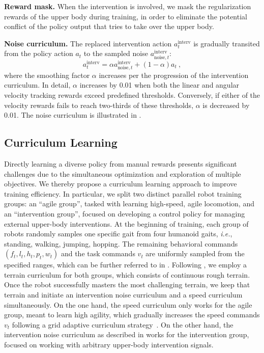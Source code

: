 \noindent\textbf{Reward mask.}
When the intervention is involved, we mask the regularization rewards of the upper body during training, in order to eliminate the potential conflict of the policy output that tries to take over the upper body.

\noindent\textbf{Noise curriculum.}
The replaced intervention action $a_t^{\text{interv}}$ is gradually transited from the policy action $a_t$ to the sampled noise $a^{\text{interv}}_{\text{noise}, t}$:
\begin{equation}
    a_t^{\text{interv}} = \alpha a^{\text{interv}}_{\text{noise}, t} + (1-\alpha) a_t~,
    \label{eq:noisecurr}
\end{equation}
where the smoothing factor $\alpha$ increases per the progression of the intervention curriculum. In detail, $\alpha$ increases by 0.01 when both the linear and angular velocity tracking rewards exceed predefined thresholds. Conversely, if either of the velocity rewards fails to reach two-thirds of these thresholds, $\alpha$ is decreased by 0.01. The noise curriculum is illustrated in .

\subsection{Curriculum Learning}
Directly learning a diverse policy from manual rewards presents significant challenges due to the simultaneous optimization and exploration of multiple objectives. We thereby propose a curriculum learning approach to improve training efficiency. In particular, we split two distinct parallel robot training groups: an ``agile group'', tasked with learning high-speed, agile locomotion, and an ``intervention group'', focused on developing a control policy for managing external upper-body interventions.
% 
At the beginning of training, each group of robots randomly samples one specific gait from four humanoid gaits, \textit{i.e.}, standing, walking, jumping, hopping. The remaining behavioral commands $(f_t, l_t, h_t, p_t, w_t)$ and the task commands $v_t$ are uniformly sampled from the specified ranges, which can be further referred to in . 
Following \cite{wjzamp}, we employ a terrain curriculum for both groups, which consists of continuous rough terrain. Once the robot successfully masters the most challenging terrain, we keep that terrain and initiate an intervention noise curriculum and a speed curriculum simultaneously.
On the one hand, the speed curriculum only works for the agile group, meant to learn high agility, which gradually increases the speed commands $v_t$ following a grid adaptive curriculum strategy~\citep{margolis2022rapid}.
On the other hand, the intervention noise curriculum as described in  works for the intervention group, focused on working with arbitrary upper-body intervention signals.




